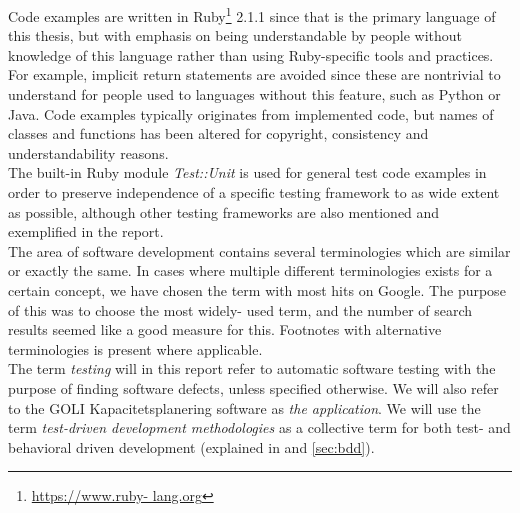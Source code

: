 
Code examples are written in Ruby\footnote{\url{https://www.ruby-
lang.org}} 2.1.1 since that is the primary language of this thesis, but
with emphasis on being understandable by people without knowledge of
this language rather than using Ruby-specific tools and practices. For
example, implicit return statements are avoided since these are
nontrivial to understand for people used to languages without this
feature, such as Python or Java. Code examples typically originates from
implemented code, but names of classes and functions has been altered
for copyright, consistency and understandability reasons.\\

The built-in Ruby module \emph{Test::Unit} is used for general test code
examples in order to preserve independence of a specific testing
framework to as wide extent as possible, although other testing
frameworks are also mentioned and exemplified in the report.\\

The area of software development contains several terminologies which
are similar or exactly the same. In cases where multiple different
terminologies exists for a certain concept, we have chosen the term with
most hits on Google. The purpose of this was to choose the most widely-
used term, and the number of search results seemed like a good measure
for this. Footnotes with alternative terminologies is present where
applicable.\\

The term \emph{testing} will in this report refer to automatic software
testing with the purpose of finding software defects, unless specified
otherwise. We will also refer to the GOLI Kapacitetsplanering software
as \emph{the application}. We will use the term \emph{test-driven
development methodologies} as a collective term for both test- and
behavioral driven development (explained in  and
\ref{sec:bdd}).\\
